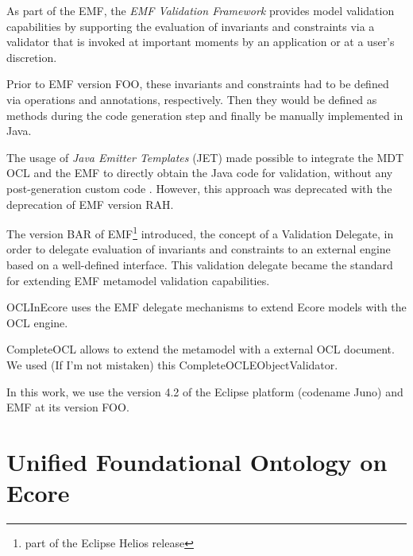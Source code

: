 \documentclass[
	10pt,				%
	oneside,
	a4paper,			%
	brazil,
	english
	]{abntex2}
\begin{document}
As part of the EMF, the \emph{EMF Validation Framework} provides model validation
capabilities by supporting the evaluation of invariants and constraints via a
validator that is invoked at important moments by an application or at a user's
discretion. \cite{emf_helios_nn}

Prior to EMF version FOO, these invariants and constraints had to be defined
via operations and annotations, respectively. \cite[Chapter~18]{budinsky09}
Then they would be defined as methods during the code generation step and finally
be manually implemented in Java.


The usage of \emph{Java Emitter Templates} (JET) made possible to integrate the
MDT OCL and the EMF to directly obtain the Java code for validation,
without any post-generation custom code \cite{damus07}.
However, this approach was deprecated with the deprecation of EMF version RAH.

The version BAR of EMF\footnote{part of the Eclipse Helios release} introduced,
the concept of a Validation Delegate, in order to delegate evaluation of invariants and
constraints to an external engine based on a well-defined interface.\cite{emf_helios_nn}
This validation delegate became the standard for extending EMF metamodel validation
capabilities.


OCLInEcore uses the EMF delegate mechanisms to extend Ecore models with the OCL
engine.

CompleteOCL allows to extend the metamodel with a external OCL document.
We used (If I'm not mistaken) this CompleteOCLEObjectValidator.

In this work, we use the version 4.2 of the Eclipse platform (codename Juno) and
EMF at its version FOO.

\section{Unified Foundational Ontology on Ecore}
\end{document}
